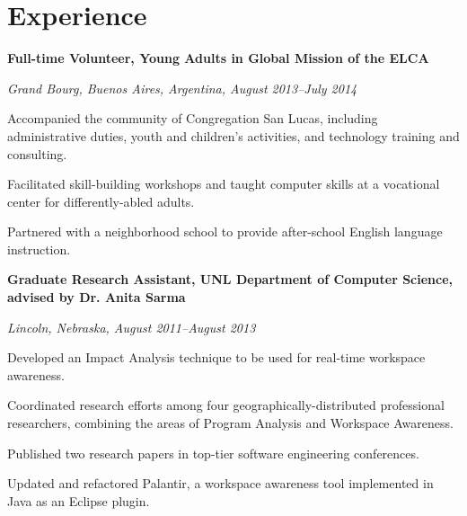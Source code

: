 \documentclass[10pt,letterpaper]{article}
\renewenvironment{itemize}{
  \begin{list}{}{
    \setlength{\leftmargin}{1.5em}
    \setlength{\itemsep}{0.25em}
    \setlength{\parskip}{0pt}
    \setlength{\parsep}{0.25em}
  }
}{
  \end{list}
}
\begin{document}
\section*{Experience}

\begin{itemize}
\item \textbf{Full-time Volunteer, Young Adults in Global Mission of the ELCA}
\item \emph{Grand Bourg, Buenos Aires, Argentina, August 2013--July 2014}
	\begin{itemize}
    \item Accompanied the community of Congregation San Lucas, including
    administrative duties, youth and children's activities, and technology
    training and consulting.
    \item Facilitated skill-building workshops and taught computer skills at
    a vocational center for differently-abled adults.
    \item Partnered with a neighborhood school to provide after-school
    English language instruction.
	\end{itemize}
\end{itemize}

\begin{itemize}
\item \textbf{Graduate Research Assistant, UNL Department of Computer Science, advised by Dr. Anita Sarma}
\item \emph{Lincoln, Nebraska, August 2011--August 2013}
	\begin{itemize}
	\item Developed an Impact Analysis technique to be used for real-time
    workspace awareness.
    \item Coordinated research efforts among four
    geographically-distributed
    professional researchers, combining the areas of Program Analysis and
    Workspace Awareness.
    \item Published two research papers in top-tier software engineering
    conferences.
	\item Updated and refactored Palantir, a workspace awareness tool
    implemented in Java as an Eclipse plugin.
	\end{itemize}
\end{itemize}

\begin{comment}
\begin{itemize}
\item \textbf{Host and Fellowship Coordinator, August 2012--July 2013}
\item \emph{Lutheran Student Center (ELCA), University of Nebraska-Lincoln}
    \begin{itemize}
    \item Clean and maintain the Lutheran Student Center building.
    \item Engage students with fun fellowship opportunities such as movie
    nights and pool leagues.
    \end{itemize}
\end{itemize}
\end{comment}
\end{document}
